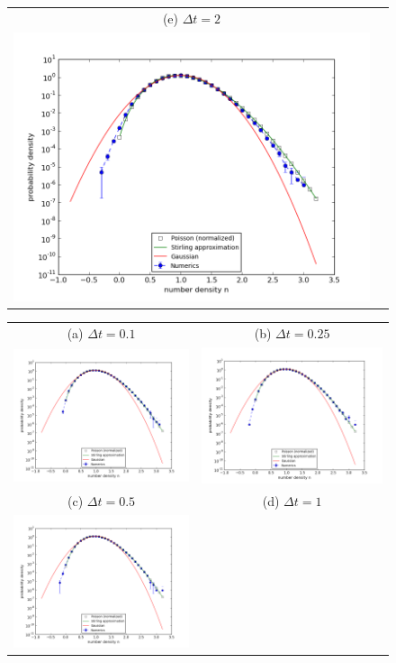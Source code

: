 \documentclass{article}
\begin{document}
\begin{figure}
\begin{tabular}{cc}
(e) $\Delta t=2$ & \\
\includegraphics[width=0.5\linewidth]{fig1/1d_DIFF_dt2_hist.png} &
\end{tabular}
\caption{\label{fig_1d_DIFF_hist}}
\end{figure}

\begin{figure}
\begin{center}
\end{center}
\begin{tabular}{cc}
(a) $\Delta t=0.1$ & (b) $\Delta t=0.25$ \\
\includegraphics[width=0.5\linewidth]{fig1/1d_REACT_dt0.1_hist.png} &
\includegraphics[width=0.5\linewidth]{fig1/1d_REACT_dt0.25_hist.png} \\
(c) $\Delta t=0.5$ & (d) $\Delta t=1$ \\
\includegraphics[width=0.5\linewidth]{fig1/1d_REACT_dt0.5_hist.png} &

\end{tabular}
\end{figure}
\end{document}
